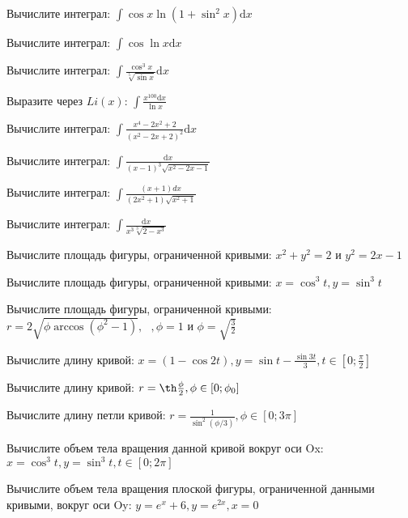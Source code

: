 \documentclass[russian]{article}
\newcommand{\dx}{\text{d}x}
\begin{document}
Вычислите интеграл:
$\int \cos x \ln (1 + \sin^2 x) \dx$

Вычислите интеграл:
$\int \cos \ln x \dx$

Вычислите интеграл:
$\int \frac{\cos^3 x}{\sqrt[5]{\sin x}}\dx$

Выразите через $Li(x)$:
$\int \frac{x^{100} \dx}{\ln x}$




Вычислите интеграл:
$\int \frac{x^4 - 2x^2 + 2}{(x^2 - 2x + 2)^2}\dx$

Вычислите интеграл:
$\int \frac{\dx}{(x - 1)^3 \sqrt{x^2 - 2x - 1}}$

Вычислите интеграл:
$\int \frac{(x + 1)dx}{(2x^2 + 1) \sqrt{x^2 + 1}}$

Вычислите интеграл:
$\int \frac{\dx}{x^3 \sqrt[3]{2 - x^3}}$








Вычислите площадь фигуры, ограниченной кривыми:
$x^2 +y^2 = 2 \text{ и } y^2 = 2x - 1$

Вычислите площадь фигуры, ограниченной кривыми:
$x = \cos^3 t, y = \sin^3 t$

Вычислите площадь фигуры, ограниченной кривыми:
$r = 2\sqrt{\phi\arccos(\phi^2 - 1)}, \text{ }, \phi = 1 \text{ и } \phi = \sqrt{\frac{3}{2}}$







Вычислите длину кривой:
$x = (1 - \cos 2t), y = \sin t - \frac{\sin 3t}{3}, t \in [0; \frac{\pi}{2}]$

Вычислите длину кривой:
$r = \th \frac{\phi}{2}, \phi \in [0; \phi_0]$

Вычислите длину петли кривой:
$r = \frac{1}{\sin^2 (\phi / 3)}, \phi \in [0; 3\pi]$

Вычислите объем тела вращения данной кривой вокруг оси Ox:
$x = \cos^3 t, y = \sin^3 t, t\in[0; 2\pi]$

Вычислите объем тела вращения плоской фигуры, ограниченной данными кривыми, вокруг оси Oy:
$y = e^x + 6, y = e^{2x}, x = 0$ 
\end{document}
